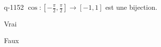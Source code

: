 \begin{truefalse}{q-1152}
$\cos: \left[ - \frac \pi 2, \frac \pi 2 \right]\to[-1,1]$ est une bijection.
\item Vrai
\item* Faux
\end{truefalse}

